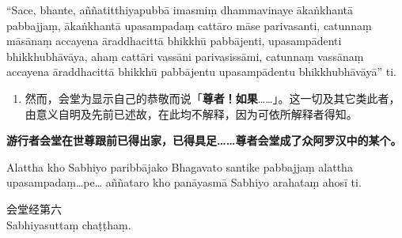 “Sace, bhante, aññatitthiyapubbā imasmiṃ dhammavinaye ākaṅkhantā pabbajjaṃ, ākaṅkhantā upasampadaṃ cattāro māse parivasanti, catunnaṃ māsānaṃ accayena āraddhacittā bhikkhū pabbājenti, upasampādenti bhikkhubhāvāya, ahaṃ cattāri vassāni parivasissāmi, catunnaṃ vassānaṃ accayena āraddhacittā bhikkhū pabbājentu upasampādentu bhikkhubhāvāyā” ti.

\begin{enumerate}\item 然而，会堂为显示自己的恭敬而说「\textbf{尊者！如果}……」。这一切及其它类此者，由意义自明及先前已述故，在此均不解释，因为可依所解释者得知。\end{enumerate}

\textbf{游行者会堂在世尊跟前已得出家，已得具足……尊者会堂成了众阿罗汉中的某个。}

Alattha kho Sabhiyo paribbājako Bhagavato santike pabbajjaṃ alattha upasampadaṃ…pe… aññataro kho panāyasmā Sabhiyo arahataṃ ahosī ti.

\begin{center}\vspace{1em}会堂经第六\\Sabhiyasuttaṃ chaṭṭhaṃ.\end{center}